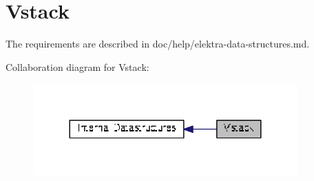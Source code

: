 \hypertarget{group__vstack}{\section{Vstack}
\label{group__vstack}
}


The requirements are described in doc/help/elektra-\/data-\/structures.\+md.  


Collaboration diagram for Vstack\+:
\nopagebreak
\begin{figure}[H]
\begin{center}
\leavevmode
\includegraphics[width=288pt]{group__vstack}
\end{center}
\end{figure}
